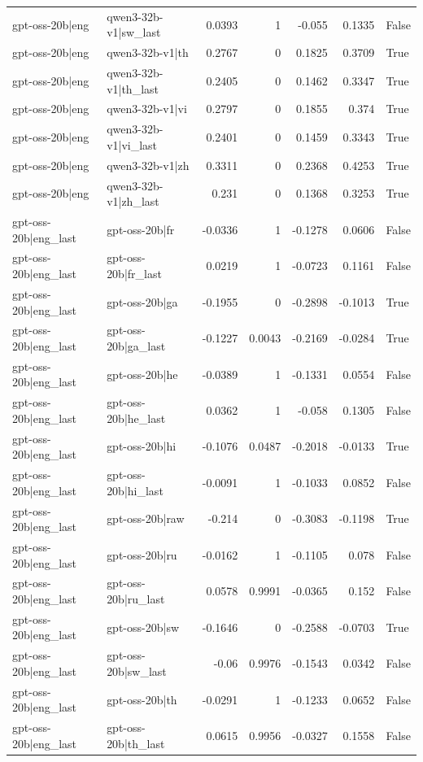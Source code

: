\begin{table}
\begin{tabular}{l l r r r r l}
gpt-oss-20b|eng & qwen3-32b-v1|sw_last & 0.0393 & 1 & -0.055 & 0.1335 & False \\
gpt-oss-20b|eng & qwen3-32b-v1|th & 0.2767 & 0 & 0.1825 & 0.3709 & True \\
gpt-oss-20b|eng & qwen3-32b-v1|th_last & 0.2405 & 0 & 0.1462 & 0.3347 & True \\
gpt-oss-20b|eng & qwen3-32b-v1|vi & 0.2797 & 0 & 0.1855 & 0.374 & True \\
gpt-oss-20b|eng & qwen3-32b-v1|vi_last & 0.2401 & 0 & 0.1459 & 0.3343 & True \\
gpt-oss-20b|eng & qwen3-32b-v1|zh & 0.3311 & 0 & 0.2368 & 0.4253 & True \\
gpt-oss-20b|eng & qwen3-32b-v1|zh_last & 0.231 & 0 & 0.1368 & 0.3253 & True \\
gpt-oss-20b|eng_last & gpt-oss-20b|fr & -0.0336 & 1 & -0.1278 & 0.0606 & False \\
gpt-oss-20b|eng_last & gpt-oss-20b|fr_last & 0.0219 & 1 & -0.0723 & 0.1161 & False \\
gpt-oss-20b|eng_last & gpt-oss-20b|ga & -0.1955 & 0 & -0.2898 & -0.1013 & True \\
gpt-oss-20b|eng_last & gpt-oss-20b|ga_last & -0.1227 & 0.0043 & -0.2169 & -0.0284 & True \\
gpt-oss-20b|eng_last & gpt-oss-20b|he & -0.0389 & 1 & -0.1331 & 0.0554 & False \\
gpt-oss-20b|eng_last & gpt-oss-20b|he_last & 0.0362 & 1 & -0.058 & 0.1305 & False \\
gpt-oss-20b|eng_last & gpt-oss-20b|hi & -0.1076 & 0.0487 & -0.2018 & -0.0133 & True \\
gpt-oss-20b|eng_last & gpt-oss-20b|hi_last & -0.0091 & 1 & -0.1033 & 0.0852 & False \\
gpt-oss-20b|eng_last & gpt-oss-20b|raw & -0.214 & 0 & -0.3083 & -0.1198 & True \\
gpt-oss-20b|eng_last & gpt-oss-20b|ru & -0.0162 & 1 & -0.1105 & 0.078 & False \\
gpt-oss-20b|eng_last & gpt-oss-20b|ru_last & 0.0578 & 0.9991 & -0.0365 & 0.152 & False \\
gpt-oss-20b|eng_last & gpt-oss-20b|sw & -0.1646 & 0 & -0.2588 & -0.0703 & True \\
gpt-oss-20b|eng_last & gpt-oss-20b|sw_last & -0.06 & 0.9976 & -0.1543 & 0.0342 & False \\
gpt-oss-20b|eng_last & gpt-oss-20b|th & -0.0291 & 1 & -0.1233 & 0.0652 & False \\
gpt-oss-20b|eng_last & gpt-oss-20b|th_last & 0.0615 & 0.9956 & -0.0327 & 0.1558 & False \\

\end{tabular}
\end{table}
